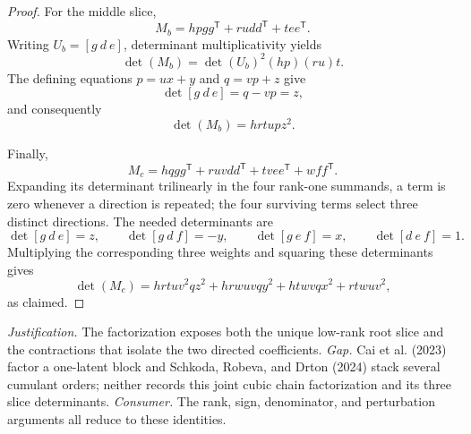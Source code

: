\documentclass{article}
\begin{document}
\begin{proof}
For the middle slice,
\[
M_b=hpgg^{\mathsf T}+rudd^{\mathsf T}+tee^{\mathsf T}.
\]
Writing \(U_b=[g\ d\ e]\), determinant multiplicativity yields
\[
\det(M_b)
=\det(U_b)^2(hp)(ru)t.
\]
The defining equations \(p=ux+y\) and \(q=vp+z\) give
\[
\det[g\ d\ e]=q-vp=z,
\]
and consequently
\[
\det(M_b)=hrtu p z^2.
\]

Finally,
\[
M_c=hqgg^{\mathsf T}+ruvdd^{\mathsf T}+tvee^{\mathsf T}+wff^{\mathsf T}.
\]
Expanding its determinant trilinearly in the four rank-one summands, a term is zero whenever a direction is repeated; the four surviving terms select three distinct directions.  The needed determinants are
\[
\det[g\ d\ e]=z,
\qquad
\det[g\ d\ f]=-y,
\qquad
\det[g\ e\ f]=x,
\qquad
\det[d\ e\ f]=1.
\]
Multiplying the corresponding three weights and squaring these determinants gives
\[
\det(M_c)
=hrtu v^2qz^2+hrwuvqy^2+htwvqx^2+rtwuv^2,
\]
as claimed.
\end{proof}
\par\smallskip\noindent \textit{Justification.} The factorization exposes both the unique low-rank root slice and the contractions that isolate the two directed coefficients. \textit{Gap.} Cai et al. (2023) factor a one-latent block and Schkoda, Robeva, and Drton (2024) stack several cumulant orders; neither records this joint cubic chain factorization and its three slice determinants. \textit{Consumer.} The rank, sign, denominator, and perturbation arguments all reduce to these identities.
\end{document}
